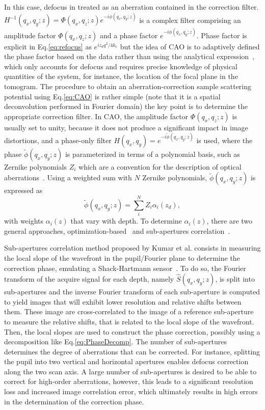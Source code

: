 In this case, defocus in treated as an aberration contained in the correction filter. $H^{-1}(q_x, q_y; z) = \Phi(q_x,q_z;z) e^{-i\phi(q_x, q_y; z)}$ is a complex filter comprising an amplitude factor $\Phi(q_x,q_z;z)$ and a phase factor $e^{-i\phi(q_x, q_y; z)}$. Phase factor is explicit in Eq.\eqref{eq:refocus} as $e^{iz_dq^2/4k_c}$ but the idea of CAO is to adaptively defined the phase factor based on the data rather than using the analytical expression~\cite{Adie2012_Computational}, which only accounts for defocus and requires precise knowledge of physical quantities of the system, for instance, the location of the focal plane in the tomogram. The procedure to obtain an aberration-correction sample scattering potential using Eq.\eqref{eq:CAO} is rather simple (note that it is a spatial deconvolution performed in Fourier domain) the key point is to determine the appropriate correction filter. In CAO, the amplitude factor $\Phi(q_x,q_z;z)$ is usually set to unity, because it does not produce a significant impact in image distortions, and a phase-only filter $H(q_x,q_y)=e^{-i\tilde{\phi}(q_x, q_y; z)}$ is used, where the phase $\tilde{\phi}(q_x, q_y; z)$ is parameterized in terms of a polynomial basis, such as Zernike polynomials $Z_i$ which are a convention for the description of optical aberrations~\cite{Malacara2007_Optical, Lakshminarayanan2011_Zernike}. Using a weighted sum with $N$ Zernike polynomials, $\tilde{\phi}(q_x, q_y; z)$ is expressed as
\begin{equation}\label{eq:PhaseDecomp}
	\tilde{\phi}(q_x, q_y; z) = \sum_i^N Z_i\alpha_i(z_d),
\end{equation} 
with weights $\alpha_i(z)$ that vary with depth. To determine $\alpha_i(z)$, there are two general approaches, optimization-based~\cite{Adie2012_Computational} and sub-apertures correlation~\cite{Kumar2013_Subaperture}.

Sub-apertures correlation method proposed by Kumar et al. consists in measuring the local slope of the wavefront in the pupil/Fourier plane to determine the correction phase, emulating a Shack-Hartmann sensor~\cite{Kumar2013_Subaperture}. To do so, the Fourier transform of the acquire signal for each depth, namely $\hat{S}(q_x, q_y; z)$, is split into sub-apertures and the inverse Fourier transform of each sub-aperture is computed to yield images that will exhibit lower resolution and relative shifts between them. These image are cross-correlated to the image of a reference sub-aperture to measure the relative shifts, that is related to the local slope of the wavefront. Then, the local slopes are used to construct the phase correction, possibly using a decomposition like Eq.\eqref{eq:PhaseDecomp}. The number of sub-apertures determines the degree of aberrations that can be corrected. For instance, splitting the pupil into two vertical and horizontal apertures enables defocus correction along the two scan axis. A large number of sub-apertures is desired to be able to correct for high-order aberrations, however, this leads to a significant resolution loss and increased image correlation error, which ultimately results in high errors in the determination of the correction phase.

